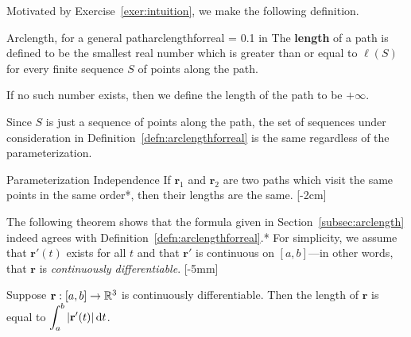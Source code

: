 \documentclass[prettycode,shellescape]{watsonbook}
\begin{document}
Motivated by Exercise~\ref{exer:intuition}, we make the following
definition.  

\begin{defn}{Arclength, for a general path}{arclengthforreal}
  \parskip = 0.1 in 
  The \textbf{length} of a path is defined to be the smallest real
  number which is greater than or equal to $\ell(S)$ for every
  finite sequence $S$ of points along the path.

  If no such number exists, then we define the length of the path to be
  $+\infty$. 
\end{defn}

Since $S$ is just a sequence of points along the path, the set of
sequences under consideration in
Definition~\ref{defn:arclengthforreal} is the same regardless of
the parameterization.

\begin{theo}{Parameterization Independence}{}
  If $\mathbf{r}_1$ and $\mathbf{r}_2$ are two paths which visit the
  same points in the same order*, then their lengths are the
  same. [-2cm]
\end{theo}

The following theorem shows that the formula given in
Section~\ref{subsec:arclength} indeed agrees with
Definition~\ref{defn:arclengthforreal}.* For simplicity, we assume
that $\mathbf{r}'(t)$ exists for all $t$ and that $\mathbf{r}'$ is
continuous on $[a,b]$---in other words, that $\mathbf{r}$ is
\textit{continuously differentiable}.  [-5mm]

\begin{theo}{}{}
  Suppose $\mathbf{r}:[a,b] \to \mathbb{R}^3$ is continuously
  differentiable. Then the length of $\mathbf{r}$ is equal to
  $\displaystyle{\int_a^b |\mathbf{r}'(t)| \, \mathrm{d}t}$.
\end{theo}
\end{document}
